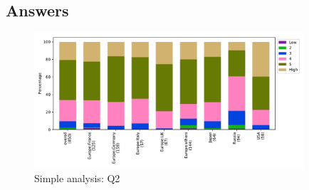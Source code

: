 
\subsection{Answers}


\begin{figure}[htb]
\begin{center}
\includegraphics[width=10cm]{../pdfs/Q2.pdf}
\caption{Simple analysis: Q2}
\label{fig:Q2}
\end{center}
\end{figure}
